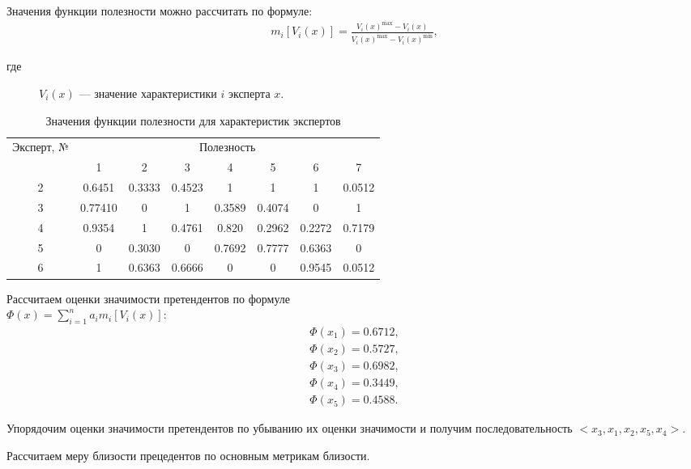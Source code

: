 Значения функции полезности можно рассчитать по формуле:
\begin{align*}
	m_i[V_i(x)] = \frac{V_i(x)^{\max} - V_i(x)}{V_i(x)^{\max} - V_i(x)^{\min}},
\end{align*}
\begin{description}
	\item[где] $V_i(x)$ --- значение характеристики $i$ эксперта $x$.
\end{description}

\begin{table}[H]
	\caption{Значения функции полезности для характеристик экспертов}
	\label{tab:expert_char_m}
	\begin{tabular}{|c|c|c|c|c|c|c|c|}
		\hline
        \multirow{2}{*}{Эксперт, № } & \multicolumn{7}{c|}{Полезность} \\ \cline{2-8}
         & 1 & 2 & 3 & 4 & 5 & 6 & 7 \\ \hline
        2 & 0.6451 & 0.3333 & 0.4523 & 1 & 1 & 1 & 0.0512 \\ \hline
        3 & 0.77410 & 0 & 1 & 0.3589 & 0.4074 & 0 & 1 \\ \hline
        4 & 0.9354 & 1 & 0.4761 & 0.820 & 0.2962 & 0.2272 & 0.7179 \\ \hline
        5 & 0 & 0.3030 & 0 & 0.7692 & 0.7777 & 0.6363 & 0 \\ \hline
        6 & 1 & 0.6363 & 0.6666 & 0 & 0 &	0.9545 & 0.0512 \\ \hline
	\end{tabular}
\end{table}

Рассчитаем оценки значимости претендентов по формуле \\ $\Phi(x) = \sum^n_{i=1} a_i m_i[V_i(x)]$:
\begin{align*}
	\Phi(x_1) = 0.6712, \\
	\Phi(x_2) = 0.5727, \\
	\Phi(x_3) = 0.6982, \\
	\Phi(x_4) = 0.3449, \\
	\Phi(x_5) = 0.4588.
\end{align*}

Упорядочим оценки значимости претендентов по убыванию их оценки значимости и получим последовательность $<x_3, x_1, x_2, x_5, x_4>$.

Рассчитаем меру близости прецедентов по основным метрикам близости.

